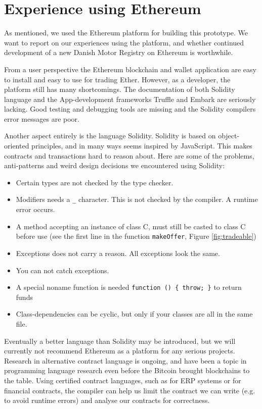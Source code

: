 \documentclass[oneside,a4paper,10pts,article]{memoir}
\begin{document}
\chapter{Experience using Ethereum}
\label{sec:ethereum-experiences}
As mentioned, we used the Ethereum platform for building this
prototype. We want to report on our experiences using the platform,
and whether continued development of a new Danish Motor Registry on
Ethereum is worthwhile. 

From a user perspective the Ethereum blockchain and wallet application
are easy to install and easy to use for trading Ether. However, as a
developer, the platform still has many shortcomings. The documentation
of both Solidity language and the App-development frameworks Truffle
and Embark are seriously lacking. Good testing and debugging tools are
missing and the Solidity compilers error messages are poor.

Another aspect entirely is the language Solidity. Solidity is based on
object-oriented principles, and in many ways seems inspired by
JavaScript. This makes contracts and transactions hard to reason
about. Here are some of the problems, anti-patterns and weird design
decisions we encountered using Solidity:
\begin{itemize}
\item Certain types are not checked by the type checker. 
\item Modifiers needs a \texttt{\_} character. This is not checked by
  the compiler. A runtime error occurs.
\item A method accepting an instance of class C, must still be casted
  to class C before use (see the first line in the function
  \texttt{makeOffer}, Figure \ref{fig:tradeable})
\item Exceptions does not carry a reason. All exceptions look the same.
\item You can not catch exceptions.
\item A special noname function is needed \texttt{function () \{ throw; \}} to return funds
\item Class-dependencies can be cyclic, but only if your classes are
  all in the same file.
\end{itemize}

Eventually a better language than Solidity may be introduced, but we
will currently not recommend Ethereum as a platform for any serious
projects. Research in alternative contract language is ongoing, and
have been a topic in programming language research even before the
Bitcoin brought blockchains to the table. Using certified contract
languages, such as \cite{hvitved2011contract} for ERP systems or
\cite{bahr2015certified} for financial contracts, the compiler can
help us limit the contract we can write (e.g. to avoid runtime errors)
and analyse our contracts for correctness.
\end{document}
